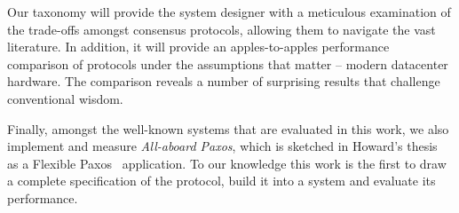 Our taxonomy will provide the system designer with a meticulous examination of the trade-offs amongst consensus protocols, allowing them to navigate the vast literature.
In addition, it will provide an apples-to-apples performance comparison of protocols under the assumptions that matter -- \ie modern datacenter hardware. The comparison reveals a number of surprising results that challenge conventional wisdom.

Finally, amongst the well-known systems that are evaluated in this work, we also implement and measure \emph{All-aboard Paxos}, which is sketched in Howard's thesis~\cite{Howard:2019} as a Flexible Paxos~\cite{Howard:2018} application. To our knowledge this work is the first to draw a complete specification of the protocol, build it into a system and evaluate its performance.

\begin{comment}
Finally, as part of our evaluation, we implement and measure for the first time \emph{All-aboard Paxos}, which is sketched in Howard's thesis~\cite{Howard:2019} as a Flexible Paxos~\cite{Howard:2018} application. We draw a complete specification, measure its limits and present it as a viable option.



\beginbsec{What this paper does}
The purpose of this paper is dual: 1) it is addressed to the %
system designer, aiming to provide them with a map to navigate the vast literature of consensus. 2) It addresses the research community, aiming to 
drive the dialogue on 
high-performance consensus algorithms, in the light of contemporary hardware.
Towards these goals we present: a taxonomy of consensus protocols and a comprehensive evaluation of high-performance implementations of at least one representative protocol from each class.  
Our taxonomy meticulously examines the trade-offs of the different techniques in the light of modern era hardware, revealing surprising results, that challenge the conventional wisdom, while also bringing to light a class of protocols, that has not yet received the warranted attention.
In every step of the way, we substantiate our claims through the evaluated systems.
\end{comment}

